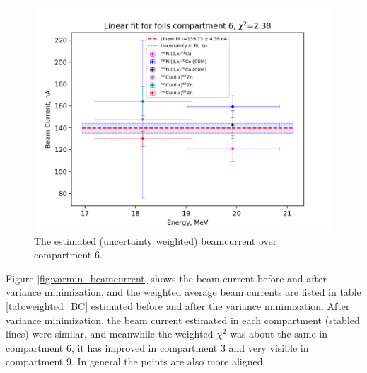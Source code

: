 \begin{figure}
    \centering
    \includegraphics{Analysis/Compartment_6.png}
    \caption{The estimated (uncertainty weighted) beamcurrent over compartment 6. }
    \label{fig:BC_comp6}
\end{figure}

Figure \ref{fig:varmin_beamcurrent} shows the beam current before and after variance minimization, and the weighted average beam currents are listed in table \ref{tab:weighted_BC} estimated before and after the variance minimization. After variance minimization, the beam current estimated in each compartment (stabled lines) were similar, and meanwhile the weighted $\chi^2$ was about the same in compartment 6, it has improved in compartment 3 and very visible in compartment 9. In general the points are also more aligned. 


